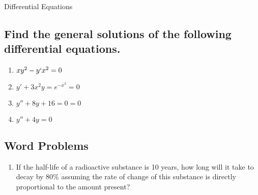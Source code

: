 \documentclass{article}
\begin{document}
\begin{center}
\begin{Huge}Differential Equations\end{Huge}
\end{center}


\subsection{Find the general solutions of the following differential equations.}

\begin{multicols}{2}
\begin{enumerate}
\item $xy^2-y`x^2=0$
\item $y'+3x^2y=e^{-x^3}=0$
\item $y''+8y+16=0=0$
\item $y''+4y=0$
\end{enumerate}
\end{multicols}


\subsection{Word Problems}
\begin{enumerate}
\item If the half-life of a radioactive substance is 10 years, how long will it take to decay by 80\% assuming the rate of change of this substance is directly proportional to the amount present?
\end{enumerate}
\end{document}

